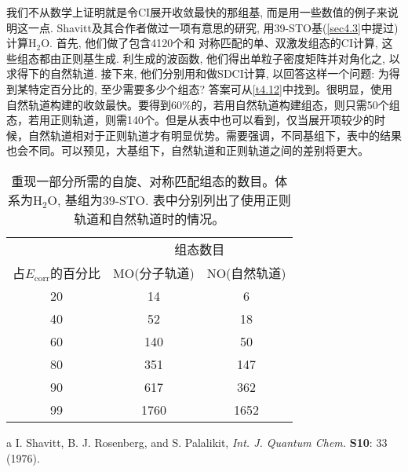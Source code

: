 我们不从数学上证明就是令CI展开收敛最快的那组基, 
而是用一些数值的例子来说明这一点. 
Shavitt及其合作者做过一项有意思的研究, 
用39-STO基(\ref{sec4.3}中提过)计算$\mathrm{H_2O}$. 
首先, 
他们做了包含4120个和\mci
{对称匹配}的单、双激发组态的CI计算, 这些组态都由正则\hft 基生成. 利生成的波函数, 他们得出单粒子密度矩阵并对角化之, 以求得下的自然轨道. 接下来, 他们分别用和做SDCI计算, 以回答这样一个问题: 为得到某特定百分比的, 至少需要多少个组态? 答案可从\ref{t4.12}中找到。很明显，使用自然轨道构建的收敛最快。要得到60\%的，若用自然轨道构建组态，则只需50个组态，若用正则轨道，则需140个。但是从表中也可以看到，仅当展开项较少的时候，自然轨道相对于正则轨道才有明显优势。需要强调，不同基组下，表中的结果也会不同。可以预见，大基组下，自然轨道和正则轨道之间的差别将更大。
\begin{table}[H]
	\begin{threeparttable}
		\caption{重现一部分所需的自旋、对称匹配组态的数目。体系为$\mathrm{H_2O}$, 基组为39-STO. 表中分别列出了使用正则轨道和自然轨道时的情况。}
		\centering
		\begin{tabular}{ccc}
			\hline
			& \multicolumn{2}{c}{组态数目} \\ \cline{2-3}
			占$E_\mathrm{corr}$的百分比 & MO(分子轨道) &   NO(自然轨道) \\ \hline
			20               &    14        &       6       \\
			40               &    52        &      18       \\
			60               &   140        &      50       \\
			80               &   351        &      147      \\
			90               &   617        &      362      \\
			99               &   1760       &     1652      \\ \hline
		\end{tabular}
		\begin{tablenotes}
			\item[a] I. Shavitt, B. J. Rosenberg, and S. Palalikit, \textit{Int. J. Quantum Chem.} \textbf{S10}: 33 (1976).
		\end{tablenotes}
	\end{threeparttable}
\end{table}
